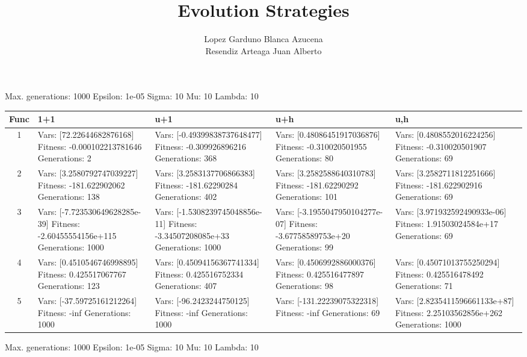 \documentclass[landscape,11pt]{article}
\begin{document}
\title{Evolution Strategies}
 \author{Lopez Garduno Blanca Azucena\\ Resendiz Arteaga Juan Alberto}
 \maketitle
Max. generations: 1000 Epsilon: 1e-05 Sigma: 10 Mu: 10 Lambda: 10 \\
\begin{tabular}{|c|p{5.4cm}|p{5.4cm}|p{5.4cm}|p{5.4cm}|}
 \hline
 Func & 1+1 & u+1 & u+h & u,h \\ 
 \hline
 1 & Vars: [72.22644682876168] Fitness: -0.000102213781646 Generations: 2 & Vars: [-0.49399838737648477] Fitness: -0.309926896216 Generations: 368 & Vars: [0.48086451917036876] Fitness: -0.310020501955 Generations: 80 & Vars: [0.4808552016224256] Fitness: -0.310020501907 Generations: 69 \\
 \hline 
 2 & Vars: [3.2580792747039227] Fitness: -181.622902062 Generations: 138 & Vars: [3.2583137706866383] Fitness: -181.62290284 Generations: 402 & Vars: [3.2582588640310783] Fitness: -181.62290292 Generations: 101 & Vars: [3.2582711812251666] Fitness: -181.622902916 Generations: 69 \\
 \hline 
 3 & Vars: [-7.723530649628285e-39] Fitness: -2.60455554156e+115 Generations: 1000 & Vars: [-1.5308239745048856e-11] Fitness: -3.34507208085e+33 Generations: 1000 & Vars: [-3.1955047950104277e-07] Fitness: -3.67758589753e+20 Generations: 99 & Vars: [3.971932592490933e-06] Fitness: 1.91503024584e+17 Generations: 69 \\
 \hline 
 4 & Vars: [0.4510546746998895] Fitness: 0.425517067767 Generations: 123 & Vars: [0.45094156367741334] Fitness: 0.425516752334 Generations: 407 & Vars: [0.4506992886000376] Fitness: 0.425516477897 Generations: 98 & Vars: [0.45071013755250294] Fitness: 0.425516478492 Generations: 71 \\
 \hline 
 5 & Vars: [-37.59725161212264] Fitness: -inf Generations: 1000 & Vars: [-96.2423244750125] Fitness: -inf Generations: 1000 & Vars: [-131.22239075322318] Fitness: -inf Generations: 69 & Vars: [2.8235411596661133e+87] Fitness: 2.25103562856e+262 Generations: 1000 \\
 \hline 
\end{tabular}
\newpage
Max. generations: 1000 Epsilon: 1e-05 Sigma: 10 Mu: 10 Lambda: 10 \\
\end{document}
